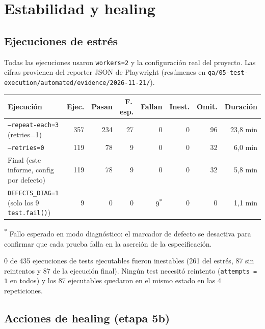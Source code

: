 \documentclass[11pt,a4paper]{article}
\newcommand{\code}[1]{\texttt{#1}}
\begin{document}
\section{Estabilidad y healing}

\subsection{Ejecuciones de estrés}

Todas las ejecuciones usaron \code{workers=2} y la configuración real del proyecto. Las cifras provienen del reporter JSON de Playwright (resúmenes en \nolinkurl{qa/05-test-execution/automated/evidence/2026-11-21/}).

\begin{center}\small
\setlength{\tabcolsep}{4.5pt}
\begin{tabularx}{\textwidth}{@{}X r r r r r r r@{}}
\toprule
Ejecución & Ejec. & Pasan & F.\,esp. & Fallan & Inest. & Omit. & Duración \\
\midrule
\code{--repeat-each=3} (retries=1) & 357 & 234 & 27 & 0 & 0 & 96 & 23,8 min \\
\code{--retries=0} & 119 & 78 & 9 & 0 & 0 & 32 & 6,0 min \\
Final (este informe, config por defecto) & 119 & 78 & 9 & 0 & 0 & 32 & 5,8 min \\
\code{DEFECTS\_DIAG=1} (solo los 9 \code{test.fail()}) & 9 & 0 & 0 & 9\textsuperscript{*} & 0 & 0 & 1,1 min \\
\bottomrule
\end{tabularx}
\end{center}
{\footnotesize\color{muted}\textsuperscript{*} Fallo esperado en modo diagnóstico: el marcador de defecto se desactiva para confirmar que cada prueba falla en la aserción de la especificación.}

\begin{infobox}
0 de 435 ejecuciones de tests ejecutables fueron inestables (261 del estrés, 87 sin reintentos y 87 de la ejecución final). Ningún test necesitó reintento (\code{attempts = 1} en todos) y los 87 ejecutables quedaron en el mismo estado en las 4 repeticiones.
\end{infobox}

\subsection{Acciones de healing (etapa 5b)}
\end{document}
